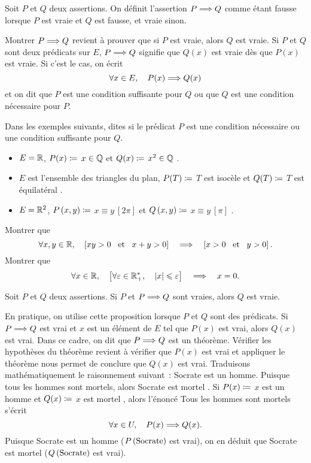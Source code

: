 \documentclass{magnoliaold}
\begin{document}
\begin{definition}[utile=-3]
Soit $P$ et $Q$ deux assertions. On définit l'assertion $P\Longrightarrow Q$ comme
étant fausse lorsque $P$ est vraie et $Q$ est fausse, et vraie sinon.
\end{definition}

\begin{remarques}
\remarque Montrer $P\Longrightarrow Q$ revient à prouver que si $P$ est
  vraie, alors $Q$ est vraie.
\remarque Si $P$ et $Q$ sont deux prédicats sur $E$, $P\Longrightarrow Q$
  signifie que $Q(x)$ est vraie dès que $P(x)$ est vraie.
  Si c'est le cas, on écrit
  \[\forall x\in E ,\quad P(x) \Longrightarrow Q(x)\]
  et on dit que $P$ est une condition suffisante pour $Q$ ou que $Q$ est une
  condition nécessaire pour $P$.
\end{remarques}

\begin{exos}
\exo Dans les exemples suivants, dites si le prédicat $P$ est une
  condition nécessaire ou une condition suffisante pour $Q$.
  \begin{itemize}
  \item $E=\mathbb{R}$, $P(x)\coloneqq$ \og $x\in\mathbb{Q}$ \fg et $Q(x)\coloneqq$ \og $x^2\in\mathbb{Q}$ \fg. 
  \item $E$ est l'ensemble des triangles du plan, $P(T)\coloneqq$ \og
    $T$ est isocèle \fg et $Q(T)\coloneqq$ \og $T$ est équilatéral \fg.
  \item $E=\mathbb{R}^2$, $P\left(x,y\right)\coloneqq$ \og $x\equiv y\ [2\pi]$ \fg et $Q\left(x,y\right)\coloneqq$
    \og $x\equiv y\ [\pi]$ \fg.
  \end{itemize}
\exo Montrer que
  \[\forall x,y\in\mathbb{R} ,\quad\left[xy>0 \quad\!\text{et}\quad\! x+y>0\right]\quad\Longrightarrow\quad
    \left[x>0 \quad\!\text{et}\quad\! y>0\right].\]
\exo Montrer que
  \[\forall x\in\mathbb{R} ,\quad
    \left[\forall \varepsilon\in\mathbb{R}_+^* ,\quad\left|x\right|\leqslant\varepsilon\right] \quad\Longrightarrow\quad
    x=0.\]
\end{exos}

\begin{proposition}[utile=-3, nom={Modus Ponens}]
Soit $P$ et $Q$ deux assertions. Si $P$ et $P\Longrightarrow Q$ sont vraies, alors
$Q$ est vraie.   
\end{proposition}

\begin{remarqueUnique}
\remarque En pratique, on utilise cette proposition lorsque $P$ et $Q$ sont des
  prédicats. Si $P\Longrightarrow Q$ est vrai et $x$ est un élément de $E$ tel que
  $P(x)$ est vrai, alors $Q(x)$ est vrai. Dans ce cadre, on dit que
  $P\Longrightarrow Q$ est un théorème. Vérifier les hypothèses
  du théorème revient à vérifier que $P(x)$ est vrai et appliquer le
  théorème nous permet de conclure que $Q(x)$ est vrai.
  Traduisons mathématiquement le raisonnement suivant~: \og Socrate
  est un homme. Puisque tous les hommes sont mortels, alors Socrate est
  mortel \fg. Si $P(x)\coloneqq$ \og $x$ est un homme \fg et $Q(x)\coloneqq$ \og $x$ est
  mortel \fg, alors l'énoncé \og Tous les hommes sont mortels \fg s'écrit
  \[\forall x\in U ,\quad P(x) \Longrightarrow Q(x).\]
  Puisque Socrate est un homme ($P\left(\text{Socrate}\right)$ est vrai), on en déduit
  que Socrate est mortel ($Q\left(\text{Socrate}\right)$ est vrai).
\end{remarqueUnique}
\end{document}

